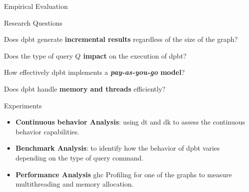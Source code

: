 \begin{frame}[fragile]{Empirical Evaluation}
  \begin{block}{Research Questions}
    \begin{itemize}
      {\color{light}
      \item Does \acrshort{dpbt} generate \textbf{incremental results} regardless of the size of the graph?
      \item Does the type of query \textbf{$Q$ impact} on the execution of \acrshort{dpbt}?
      \item How effectively \acrshort{dpbt} implements a \textbf{\emph{pay-as-you-go} model}?
      \item Does \acrshort{dpbt} handle \textbf{memory and threads} efficiently?}
  \end{itemize}        
  \end{block}
  \begin{block}{Experiments}
    \begin{itemize}
      \item \textbf{Continuous behavior Analysis}: using \acrshort{dt} and \acrshort{dk} to assess the continuous behavior capabilities.
      \item \textbf{Benchmark Analysis}: to identify how the behavior of \acrshort{dpbt} varies depending on the type of query command.
      \item \textbf{Performance Analysis} \acrfull{ghc} Profiling for one of the graphs to measure multithreading and memory allocation. 
    \end{itemize}
  \end{block}
\end{frame}

